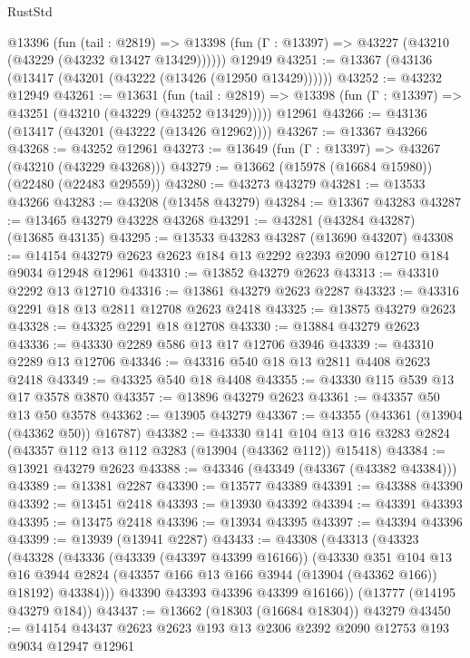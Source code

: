 \begin{lexlean}{RustStd}
\begin{coremodule}
    @13396
      (fun (tail : @2819) =>
      @13398 (fun (Γ : @13397) => @43227 (@43210 (@43229 (@43232 @13427 @13429))))))
    @12949
@43251 := @13367 (@43136 (@13417 (@43201 (@43222 (@13426 (@12950 @13429))))))
@43252 := @43232 @12949
@43261 := @13631
    (fun (tail : @2819) => @13398 (fun (Γ : @13397) => @43251 (@43210 (@43229 (@43252 @13429)))))
    @12961
@43266 := @43136 (@13417 (@43201 (@43222 (@13426 @12962))))
@43267 := @13367 @43266
@43268 := @43252 @12961
@43273 := @13649 (fun (Γ : @13397) => @43267 (@43210 (@43229 @43268)))
@43279 := @13662 (@15978 (@16684 @15980)) (@22480 (@22483 @29559))
@43280 := @43273 @43279
@43281 := @13533 @43266
@43283 := @43208 (@13458 @43279)
@43284 := @13367 @43283
@43287 := @13465 @43279 @43228 @43268
@43291 := @43281 (@43284 @43287) (@13685 @43135)
@43295 := @13533 @43283 @43287 (@13690 @43207)
@43308 := @14154 @43279 @2623 @2623 @184 @13 @2292 @2393 @2090 @12710 @184 @9034 @12948 @12961
@43310 := @13852 @43279 @2623
@43313 := @43310 @2292 @13 @12710
@43316 := @13861 @43279 @2623 @2287
@43323 := @43316 @2291 @18 @13 @2811 @12708 @2623 @2418
@43325 := @13875 @43279 @2623
@43328 := @43325 @2291 @18 @12708
@43330 := @13884 @43279 @2623
@43336 := @43330 @2289 @586 @13 @17 @12706 @3946
@43339 := @43310 @2289 @13 @12706
@43346 := @43316 @540 @18 @13 @2811 @4408 @2623 @2418
@43349 := @43325 @540 @18 @4408
@43355 := @43330 @115 @539 @13 @17 @3578 @3870
@43357 := @13896 @43279 @2623
@43361 := @43357 @50 @13 @50 @3578
@43362 := @13905 @43279
@43367 := @43355 (@43361 (@13904 (@43362 @50)) @16787)
@43382 := @43330
    @141
    @104
    @13
    @16
    @3283
    @2824
    (@43357 @112 @13 @112 @3283 (@13904 (@43362 @112)) @15418)
@43384 := @13921 @43279 @2623
@43388 := @43346 (@43349 (@43367 (@43382 @43384)))
@43389 := @13381 @2287
@43390 := @13577 @43389
@43391 := @43388 @43390
@43392 := @13451 @2418
@43393 := @13930 @43392
@43394 := @43391 @43393
@43395 := @13475 @2418
@43396 := @13934 @43395
@43397 := @43394 @43396
@43399 := @13939 (@13941 @2287)
@43433 := @43308
    (@43313
      (@43323
        (@43328
          (@43336
            (@43339 (@43397 @43399 @16166))
            (@43330
              @351
              @104
              @13
              @16
              @3944
              @2824
              (@43357 @166 @13 @166 @3944 (@13904 (@43362 @166)) @18192)
              @43384)))
        @43390
        @43393
        @43396
        @43399
        @16166))
    (@13777 (@14195 @43279 @184))
@43437 := @13662 (@18303 (@16684 @18304)) @43279
@43450 := @14154 @43437 @2623 @2623 @193 @13 @2306 @2392 @2090 @12753 @193 @9034 @12947 @12961

\end{coremodule}
\end{lexlean}
